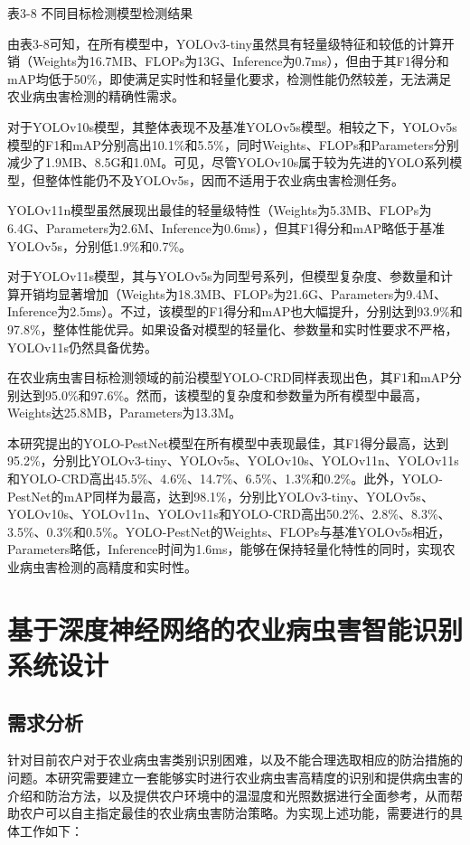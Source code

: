 \documentclass[12pt, a4paper, twoside]{ctexart}
\begin{document}
表3-8 不同目标检测模型检测结果

由表3-8可知，在所有模型中，YOLOv3-tiny虽然具有轻量级特征和较低的计算开销（Weights为16.7MB、FLOPs为13G、Inference为0.7ms），但由于其F1得分和mAP均低于50\%，即使满足实时性和轻量化要求，检测性能仍然较差，无法满足农业病虫害检测的精确性需求。

对于YOLOv10s模型，其整体表现不及基准YOLOv5s模型。相较之下，YOLOv5s模型的F1和mAP分别高出10.1\%和5.5\%，同时Weights、FLOPs和Parameters分别减少了1.9MB、8.5G和1.0M。可见，尽管YOLOv10s属于较为先进的YOLO系列模型，但整体性能仍不及YOLOv5s，因而不适用于农业病虫害检测任务。

YOLOv11n模型虽然展现出最佳的轻量级特性（Weights为5.3MB、FLOPs为6.4G、Parameters为2.6M、Inference为0.6ms），但其F1得分和mAP略低于基准YOLOv5s，分别低1.9\%和0.7\%。

对于YOLOv11s模型，其与YOLOv5s为同型号系列，但模型复杂度、参数量和计算开销均显著增加（Weights为18.3MB、FLOPs为21.6G、Parameters为9.4M、Inference为2.5ms）。不过，该模型的F1得分和mAP也大幅提升，分别达到93.9\%和97.8\%，整体性能优异。如果设备对模型的轻量化、参数量和实时性要求不严格，YOLOv11s仍然具备优势。

在农业病虫害目标检测领域的前沿模型YOLO-CRD同样表现出色，其F1和mAP分别达到95.0\%和97.6\%。然而，该模型的复杂度和参数量为所有模型中最高，Weights达25.8MB，Parameters为13.3M。

本研究提出的YOLO-PestNet模型在所有模型中表现最佳，其F1得分最高，达到95.2\%，分别比YOLOv3-tiny、YOLOv5s、YOLOv10s、YOLOv11n、YOLOv11s和YOLO-CRD高出45.5\%、4.6\%、14.7\%、6.5\%、1.3\%和0.2\%。此外，YOLO-PestNet的mAP同样为最高，达到98.1\%，分别比YOLOv3-tiny、YOLOv5s、YOLOv10s、YOLOv11n、YOLOv11s和YOLO-CRD高出50.2\%、2.8\%、8.3\%、3.5\%、0.3\%和0.5\%。YOLO-PestNet的Weights、FLOPs与基准YOLOv5s相近，Parameters略低，Inference时间为1.6ms，能够在保持轻量化特性的同时，实现农业病虫害检测的高精度和实时性。


\chapter{基于深度神经网络的农业病虫害智能识别系统设计}


\section{需求分析}

针对目前农户对于农业病虫害类别识别困难，以及不能合理选取相应的防治措施的问题。本研究需要建立一套能够实时进行农业病虫害高精度的识别和提供病虫害的介绍和防治方法，以及提供农户环境中的温湿度和光照数据进行全面参考，从而帮助农户可以自主指定最佳的农业病虫害防治策略。为实现上述功能，需要进行的具体工作如下：
\end{document}
